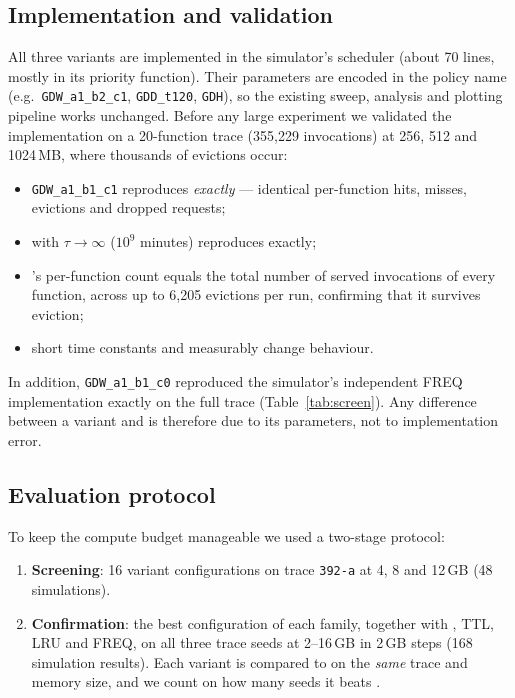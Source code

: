 \documentclass[11pt,a4paper]{article}
\newcommand{\gd}{\text{GD}}
\newcommand{\gdd}{\text{GD-D}}
\newcommand{\gdh}{\text{GD-H}}
\newcommand{\code}[1]{\texttt{#1}}
\begin{document}
\subsection{Implementation and validation}
All three variants are implemented in the simulator's scheduler (about 70 lines, mostly in
its priority function). Their
parameters are encoded in the policy name (e.g.\ \code{GDW\_a1\_b2\_c1}, \code{GDD\_t120},
\code{GDH}), so the existing sweep, analysis and plotting pipeline works unchanged. Before any
large experiment we validated the implementation on a 20-function trace (355,229 invocations)
at 256, 512 and 1024\,MB, where thousands of evictions occur:
\begin{itemize}
  \item \code{GDW\_a1\_b1\_c1} reproduces \gd{} \emph{exactly} --- identical per-function hits,
        misses, evictions and dropped requests;
  \item \gdd{} with $\tau \to \infty$ ($10^9$ minutes) reproduces \gd{} exactly;
  \item \gdh{}'s per-function count equals the total number of served invocations of every
        function, across up to 6,205 evictions per run, confirming that it survives eviction;
  \item short time constants and \gdh{} measurably change behaviour.
\end{itemize}
In addition, \code{GDW\_a1\_b1\_c0} reproduced the simulator's independent FREQ implementation
exactly on the full trace (Table~\ref{tab:screen}). Any difference between a variant and \gd{}
is therefore due to its parameters, not to implementation error.

\subsection{Evaluation protocol}
To keep the compute budget manageable we used a two-stage protocol:
\begin{enumerate}
  \item \textbf{Screening}: 16 variant configurations on trace \code{392-a} at 4, 8 and 12\,GB
        (48 simulations).
  \item \textbf{Confirmation}: the best configuration of each family, together with \gd{}, TTL,
        LRU and FREQ, on all three trace seeds at 2--16\,GB in 2\,GB steps (168 simulation
        results). Each variant is compared to \gd{} on the \emph{same} trace and memory size,
        and we count on how many seeds it beats \gd{}.
\end{enumerate}
\end{document}
